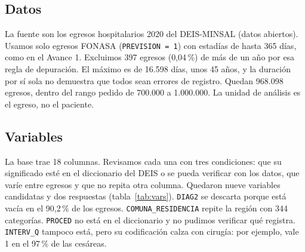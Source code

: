 \documentclass[10.5pt,a4paper,headings=small,abstract=false,bibliography=totoc,listof=totoc]{scrartcl}
\newcommand{\pct}{\,\%}
\begin{document}
\subsection{Datos}

La fuente son los egresos hospitalarios 2020 del DEIS-MINSAL (datos abiertos). Usamos solo egresos FONASA (\texttt{PREVISION = 1}) con estadías de hasta 365 días, como en el Avance 1. Excluimos 397 egresos (0,04\pct{}) de más de un año por esa regla de depuración. El máximo es de 16.598 días, unos 45 años, y la duración por sí sola no demuestra que todos sean errores de registro. Quedan 968.098 egresos, dentro del rango pedido de 700.000 a 1.000.000. La unidad de análisis es el egreso, no el paciente.

\subsection{Variables}

La base trae 18 columnas. Revisamos cada una con tres condiciones: que su significado esté en el diccionario del DEIS o se pueda verificar con los datos, que varíe entre egresos y que no repita otra columna. Quedaron nueve variables candidatas y dos respuestas (tabla~\ref{tab:vars}). \texttt{DIAG2} se descarta porque está vacía en el 90,2\pct{} de los egresos. \texttt{COMUNA\_RESIDENCIA} repite la región con 344 categorías. \texttt{PROCED} no está en el diccionario y no pudimos verificar qué registra. \texttt{INTERV\_Q} tampoco está, pero su codificación calza con cirugía: por ejemplo, vale 1 en el 97\pct{} de las cesáreas.
\end{document}
